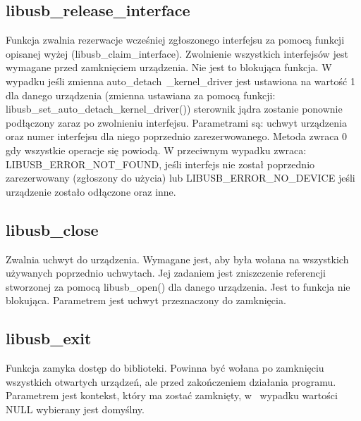 \documentclass{BscUS}
\begin{document}
\subsection{libusb\_release\_interface}
\indent Funkcja zwalnia rezerwacje wcześniej zgłoszonego interfejsu za pomocą funkcji opisanej wyżej (libusb\_claim\_interface).
Zwolnienie wszystkich interfejsów jest wymagane przed zamknięciem urządzenia.
Nie jest to blokująca funkcja.
W wypadku jeśli zmienna auto\_detach\ \newline \_kernel\_driver jest ustawiona na wartość 1 dla danego urządzenia (zmienna ustawiana za pomocą funkcji: libusb\_set\_auto\_detach\_kernel\_driver()) sterownik jądra zostanie ponownie podłączony zaraz po zwolnieniu interfejsu.
Parametrami są: uchwyt urządzenia oraz numer interfejsu dla niego poprzednio zarezerwowanego.
\newline
Metoda zwraca 0 gdy wszystkie operacje się powiodą.
W przeciwnym wypadku zwraca: LIBUSB\_ERROR\_NOT\_FOUND, jeśli interfejs nie został poprzednio zarezerwowany (zgłoszony do użycia) lub LIBUSB\_ERROR\_NO\_DEVICE jeśli urządzenie zostało odłączone oraz inne.
\subsection{libusb\_close}
\indent Zwalnia uchwyt do urządzenia.
Wymagane jest, aby była wołana na wszystkich używanych poprzednio uchwytach.
Jej zadaniem jest zniszczenie referencji stworzonej za pomocą libusb\_open() dla danego urządzenia.
Jest to funkcja nie blokująca.
Parametrem jest uchwyt przeznaczony do zamknięcia.

\subsection{libusb\_exit}
\indent Funkcja zamyka dostęp do biblioteki.
Powinna być wołana po zamknięciu wszystkich otwartych urządzeń, ale przed zakończeniem działania programu.
Parametrem jest kontekst, który ma zostać zamknięty, w~ wypadku wartości NULL wybierany jest domyślny.
\end{document}
